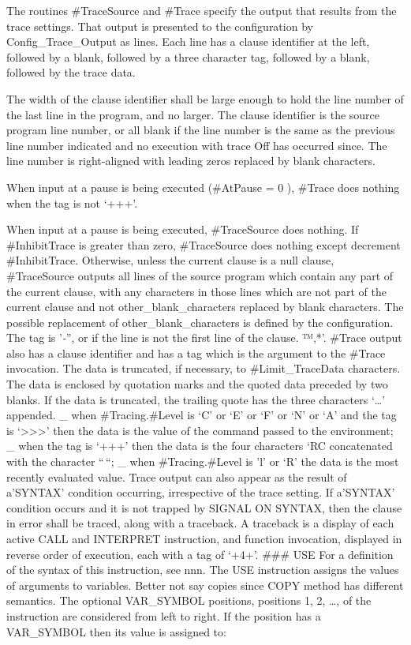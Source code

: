 The routines \#TraceSource and \#Trace specify the output that results
from the trace settings. That output is presented to the configuration
by Config\_Trace\_Output as lines. Each line has a clause identifier at
the left, followed by a blank, followed by a three character tag,
followed by a blank, followed by the trace data.

The width of the clause identifier shall be large enough to hold the
line number of the last line in the program, and no larger. The clause
identifier is the source program line number, or all blank if the line
number is the same as the previous line number indicated and no
execution with trace Off has occurred since. The line number is
right-aligned with leading zeros replaced by blank characters.

When input at a pause is being executed (\#AtPause = 0 ), \#Trace does
nothing when the tag is not `+++'.

When input at a pause is being executed, \#TraceSource does nothing. If
\#InhibitTrace is greater than zero, \#TraceSource does nothing except
decrement \#InhibitTrace. Otherwise, unless the current clause is a null
clause, \#TraceSource outputs all lines of the source program which
contain any part of the current clause, with any characters in those
lines which are not part of the current clause and not
other\_blank\_characters replaced by blank characters. The possible
replacement of other\_blank\_characters is defined by the configuration.
The tag is '\emph{-}'', or if the line is not the first line of the
clause. ™,*'. \#Trace output also has a clause identifier and has a tag
which is the argument to the \#Trace invocation. The data is truncated,
if necessary, to \#Limit\_TraceData characters. The data is enclosed by
quotation marks and the quoted data preceded by two blanks. If the data
is truncated, the trailing quote has the three characters `\ldots{}'
appended. \_ when \#Tracing.\#Level is `C' or `E' or `F' or `N' or `A'
and the tag is `\textgreater\textgreater\textgreater{}' then the data is
the value of the command passed to the environment; \_ when the tag is
`+++' then the data is the four characters `RC concatenated with the
character ``\,``; \_ when \#Tracing.\#Level is 'l' or `R' the data is
the most recently evaluated value. Trace output can also appear as the
result of a'SYNTAX' condition occurring, irrespective of the trace
setting. If a'SYNTAX' condition occurs and it is not trapped by SIGNAL
ON SYNTAX, then the clause in error shall be traced, along with a
traceback. A traceback is a display of each active CALL and INTERPRET
instruction, and function invocation, displayed in reverse order of
execution, each with a tag of `+4+'. \#\#\# USE For a definition of the
syntax of this instruction, see nnn. The USE instruction assigns the
values of arguments to variables. Better not say copies since COPY
method has different semantics. The optional VAR\_SYMBOL positions,
positions 1, 2, \ldots, of the instruction are considered from left to
right. If the position has a VAR\_SYMBOL then its value is assigned to:

